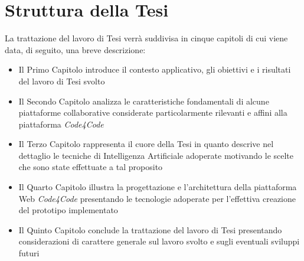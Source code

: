 \section{Struttura della Tesi}
La trattazione del lavoro di Tesi verrà suddivisa in cinque capitoli di cui viene data, di seguito, una breve descrizione:
\begin{itemize}
    \item Il Primo Capitolo introduce il contesto applicativo, gli obiettivi e i risultati del lavoro di Tesi svolto
    \item Il Secondo Capitolo analizza le caratteristiche fondamentali di alcune piattaforme collaborative considerate particolarmente rilevanti e affini alla piattaforma \emph{Code4Code}
    \item Il Terzo Capitolo rappresenta il cuore della Tesi in quanto descrive nel dettaglio le tecniche di Intelligenza Artificiale adoperate motivando le scelte che sono state effettuate a tal proposito
    \item Il Quarto Capitolo illustra la progettazione e l'architettura della piattaforma Web \emph{Code4Code} presentando le tecnologie adoperate per l'effettiva creazione del prototipo implementato
    \item Il Quinto Capitolo conclude la trattazione del lavoro di Tesi presentando considerazioni di carattere generale sul lavoro svolto e sugli eventuali sviluppi futuri
\end{itemize}